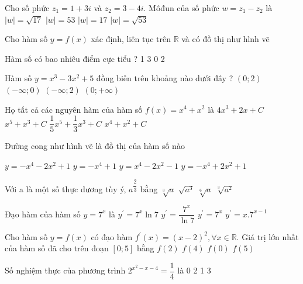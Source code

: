 \begin{ex}
 Cho số phức $z_{1}=1+3 i$ và $z_{2}=3-4 i$. Môđun của số phức $w=z_{1}-z_{2}$ là
\choice
{$|w|=\sqrt{17}$}
{$|w|=53$}
{$|w|=17$}
{$|w|=\sqrt{53}$}
\end{ex}

\begin{ex}
 Cho hàm số $y=f(x)$ xác định, liên tục trên $\mathbb{R}$ và có đồ thị như hình vẽ

Hàm số có bao nhiêu điểm cực tiểu ?
\choice
{1}
{3}
{0}
{2}
\end{ex}

\begin{ex}
 Hàm số $y=x^{3}-3 x^{2}+5$ đồng biến trên khoảng nào dưới đây ?
\choice
{$(0; 2)$}
{$(-\infty; 0)$}
{$(-\infty; 2)$}
{$(0;+\infty)$}
\end{ex}

\begin{ex}
 Họ tất cả các nguyên hàm của hàm số $f(x)=x^{4}+x^{2}$ là
\choice
{$4 x^{3}+2 x+C$}
{$x^{5}+x^{3}+C$}
{$\dfrac{1}{5} x^{5}+\dfrac{1}{3} x^{3}+C$}
{$x^{4}+x^{2}+C$}
\end{ex}

\begin{ex}
 Đường cong như hình vẽ là đồ thị của hàm số nào

\choice
{$y=-x^{4}-2 x^{2}+1$}
{$y=-x^{4}+1$}
{$y=x^{4}-2 x^{2}-1$}
{$y=-x^{4}+2 x^{2}+1$}
\end{ex}

\begin{ex}
 Với a là một số thực dương tùy ý, $a^{\dfrac{2}{3}}$ bằng
\choice
{$\sqrt[3]{a}$}
{$\sqrt{a^{3}}$}
{$\sqrt[6]{a}$}
{$\sqrt[3]{a^{2}}$}
\end{ex}

\begin{ex}
 Đạo hàm của hàm số $y=7^{x}$ là
\choice
{$y^{\prime}=7^{x} \ln 7$}
{$y^{\prime}=\dfrac{7^{x}}{\ln 7}$}
{$y^{\prime}=7^{x}$}
{$y^{\prime}=x.7^{x-1}$}
\end{ex}

\begin{ex}
 Cho hàm số $y=f(x)$ có đạo hàm $f^{\prime}(x)=(x-2)^{2}, \forall x \in \mathbb{R}$. Giá trị lớn nhất của hàm số đã cho trên đoạn $[0; 5]$ bằng
\choice
{$f(2)$}
{$f(4)$}
{$f(0)$}
{$f(5)$}
\end{ex}

\begin{ex}
 Số nghiệm thực của phương trình $2^{x^{2}-x-4}=\dfrac{1}{4}$ là
\choice
{0}
{2}
{1}
{3}
\end{ex}

